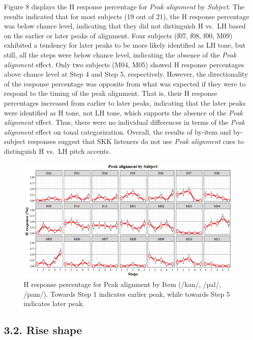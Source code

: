 \documentclass[
  man,floatsintext]{apa6}
\begin{document}
Figure 8 displays the H response percentage for \emph{Peak alignment} by \emph{Subject}. The results indicated that for most subjects (19 out of 21), the H response percentage was below chance level, indicating that they did not distinguish H vs.~LH based on the earlier or later peaks of alignment. Four subjects (f07, f08, f00, M09) exhibited a tendency for later peaks to be more likely identified as LH tone, but still, all the steps were below chance level, indicating the absence of the \emph{Peak alignment} effect. Only two subjects (M04, M05) showed H response percentages above chance level at Step 4 and Step 5, respectively. However, the directionality of the response percentage was opposite from what was expected if they were to respond to the timing of the peak alignment. That is, their H response percentages increased from earlier to later peaks, indicating that the later peaks were identified as H tone, not LH tone, which supports the absence of the \emph{Peak alignment} effect. Thus, there were no individual differences in terms of the \emph{Peak alignment} effect on tonal categorization. Overall, the results of by-item and by-subject responses suggest that SKK listeners do not use \emph{Peak alignment} cues to distinguish H vs.~LH pitch accents.

\begin{figure}[H]

{\centering \includegraphics[width=1\linewidth]{images/picture8} 

}

\caption{H response percentage for Peak alignment by Item (/kan/, /pal/, /pam/). Towards Step 1 indicates earlier peak, while towards Step 5 indicates later peak.}\label{fig:picture8}
\end{figure}

\hypertarget{rise-shape}{%
\subsection{3.2. Rise shape}\label{rise-shape}}
\end{document}
